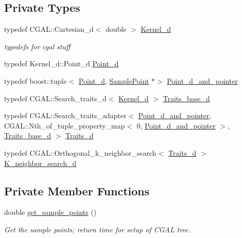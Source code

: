 \subsection*{Private Types}
\begin{DoxyCompactItemize}
\item 
typedef C\+G\+A\+L\+::\+Cartesian\+\_\+d$<$ double $>$ \hyperlink{classCGALSamplePointContainer_aa62fc873f6ad941cd31996baf64e669a}{Kernel\+\_\+d}
\begin{DoxyCompactList}\small\item\em typedefs for cgal stuff \end{DoxyCompactList}\item 
typedef Kernel\+\_\+d\+::\+Point\+\_\+d \hyperlink{classCGALSamplePointContainer_a5cb9506ad72c5a21b91e626d5d8604ed}{Point\+\_\+d}
\item 
typedef boost\+::tuple$<$ \hyperlink{classCGALSamplePointContainer_a5cb9506ad72c5a21b91e626d5d8604ed}{Point\+\_\+d}, \hyperlink{classSamplePoint}{Sample\+Point} $\ast$$>$ \hyperlink{classCGALSamplePointContainer_a9fd65260284f24b79526a9db5fb55a3b}{Point\+\_\+d\+\_\+and\+\_\+pointer}
\item 
typedef C\+G\+A\+L\+::\+Search\+\_\+traits\+\_\+d$<$ \hyperlink{classCGALSamplePointContainer_aa62fc873f6ad941cd31996baf64e669a}{Kernel\+\_\+d} $>$ \hyperlink{classCGALSamplePointContainer_ad22aa447b0cd9cfa0d92669b2d939dcc}{Traits\+\_\+base\+\_\+d}
\item 
typedef C\+G\+A\+L\+::\+Search\+\_\+traits\+\_\+adapter$<$ \hyperlink{classCGALSamplePointContainer_a9fd65260284f24b79526a9db5fb55a3b}{Point\+\_\+d\+\_\+and\+\_\+pointer}, C\+G\+A\+L\+::\+Nth\+\_\+of\+\_\+tuple\+\_\+property\+\_\+map$<$ 0, \hyperlink{classCGALSamplePointContainer_a9fd65260284f24b79526a9db5fb55a3b}{Point\+\_\+d\+\_\+and\+\_\+pointer} $>$, \hyperlink{classCGALSamplePointContainer_ad22aa447b0cd9cfa0d92669b2d939dcc}{Traits\+\_\+base\+\_\+d} $>$ \hyperlink{classCGALSamplePointContainer_abf3c9b2e8768b34dc1700c1f0d4ea342}{Traits\+\_\+d}
\item 
typedef C\+G\+A\+L\+::\+Orthogonal\+\_\+k\+\_\+neighbor\+\_\+search$<$ \hyperlink{classCGALSamplePointContainer_abf3c9b2e8768b34dc1700c1f0d4ea342}{Traits\+\_\+d} $>$ \hyperlink{classCGALSamplePointContainer_a381241085bd45dcba4709de640071982}{K\+\_\+neighbor\+\_\+search\+\_\+d}
\end{DoxyCompactItemize}
\subsection*{Private Member Functions}
\begin{DoxyCompactItemize}
\item 
double \hyperlink{classCGALSamplePointContainer_a9986b13f78a4f22113a2e41b85b73ee3}{get\+\_\+sample\+\_\+points} ()
\begin{DoxyCompactList}\small\item\em Get the sample points; return time for setup of C\+G\+AL tree. \end{DoxyCompactList}\end{DoxyCompactItemize}
